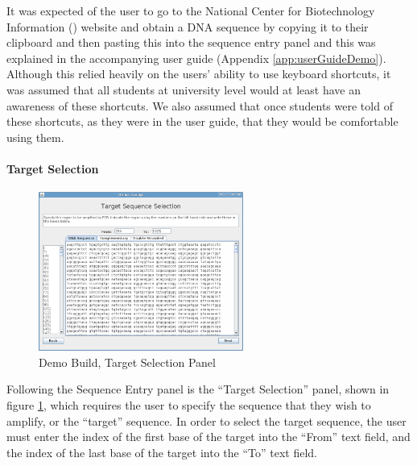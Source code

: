 It was expected of the user to go to the National Center for
Biotechnology Information (\cite{ncbi}) website and obtain a DNA sequence by
copying it to their clipboard and then pasting this into the sequence
entry panel and this was explained in the accompanying user guide
(Appendix \ref{app:userGuideDemo}).
Although this relied heavily on the users' ability to use keyboard
shortcuts, it was assumed that all students at university level would
at least have an awareness of these shortcuts.
We also assumed that once students were told of these shortcuts, as
they were in the user guide, that they would be comfortable using
them.


\paragraph{Target Selection}

\begin{figure}[!t]
  \begin{center}
    \includegraphics[width=0.6\textwidth]{./images/demoBuild/areaSelection.png}
    \caption{
      \label{fig:demoBuild:areaSelection}
      Demo Build, Target Selection Panel
    }
  \end{center}
\end{figure}

Following the Sequence Entry panel is the ``Target Selection'' panel,
shown in figure \ref{fig:demoBuild:areaSelection}, which requires the
user to specify the sequence that they wish to amplify, or the
``target'' sequence.
In order to select the target sequence, the user must enter the index
of the first base of the target into the ``From'' text field, and the
index of the last base of the target into the ``To'' text field.


